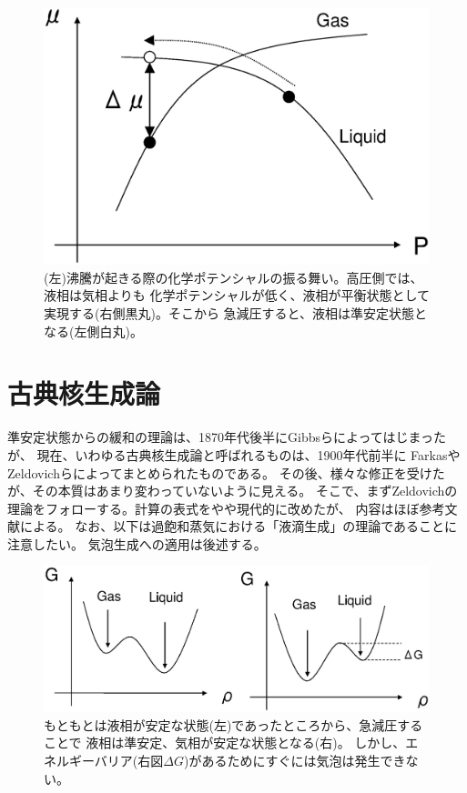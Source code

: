 \documentclass{jarticle}
\begin{document}
\begin{figure}[htbp]
    \begin{center}
        \includegraphics[width=0.48\linewidth]{chem.eps}
    \end{center}
    \caption{
        (左)沸騰が起きる際の化学ポテンシャルの振る舞い。高圧側では、液相は気相よりも
        化学ポテンシャルが低く、液相が平衡状態として実現する(右側黒丸)。そこから
        急減圧すると、液相は準安定状態となる(左側白丸)。
    }
    \label{fig_chem}
\end{figure}

\section{古典核生成論}

準安定状態からの緩和の理論は、1870年代後半にGibbsらによってはじまったが、
現在、いわゆる古典核生成論と呼ばれるものは、1900年代前半に
FarkasやZeldovichらによってまとめられたものである。
その後、様々な修正を受けたが、その本質はあまり変わっていないように見える。
そこで、まずZeldovichの理論をフォローする。計算の表式をやや現代的に改めたが、
内容はほぼ参考文献\cite{CNT}による。
なお、以下は過飽和蒸気における「液滴生成」の理論であることに注意したい。
気泡生成への適用は後述する。

\begin{figure}[htbp]
    \begin{center}
        \includegraphics[width=0.9\linewidth]{chem2.eps}
    \end{center}
    \caption{
        もともとは液相が安定な状態(左)であったところから、急減圧することで
        液相は準安定、気相が安定な状態となる(右)。
        しかし、エネルギーバリア(右図$\Delta G$)があるためにすぐには気泡は発生できない。
    }
    \label{fig_chem2}
\end{figure}
\end{document}
